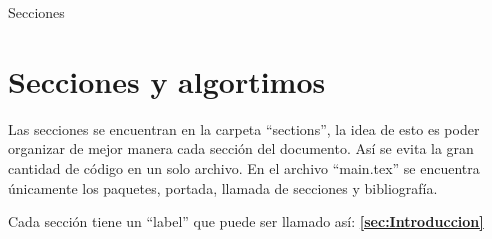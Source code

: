 \begin{frame}{Secciones}
\section{Secciones y algortimos}
\label{sec:Secciones}

Las secciones se encuentran en la carpeta “sections”, la idea de esto es poder organizar de mejor manera cada sección del documento. Así se evita la gran cantidad de código en un solo archivo. En el archivo “main.tex” se encuentra únicamente los paquetes, portada, llamada de secciones y bibliografía.

Cada sección tiene un “label” que puede ser llamado así: \textbf{\ref{sec:Introduccion}}

\end{frame}